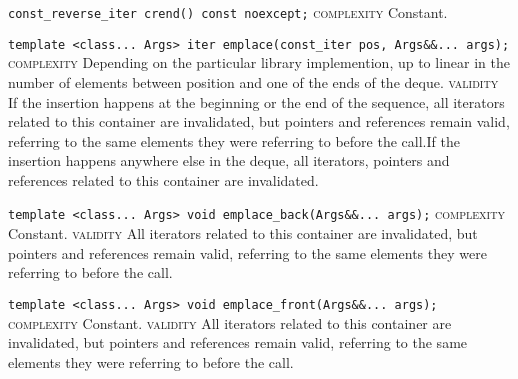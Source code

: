 \noindent{}\hspace*{0.25em}\lstinline[basicstyle=\ttfamily\color{cgreen}]{const_reverse_iter crend() const noexcept;} \textsc{complexity} Constant.\\\vspace{-0.6em}

\noindent{}\hspace*{0.25em}\lstinline[basicstyle=\ttfamily\color{corange}]{template <class... Args> iter emplace(const_iter pos, Args&&... args);} \textsc{complexity} Depending on the particular library implemention, up to linear in the number of elements between position and one of the ends of the deque. \textsc{validity} If the insertion happens at the beginning or the end of the sequence, all iterators related to this container are invalidated, but pointers and references remain valid, referring to the same elements they were referring to before the call.If the insertion happens anywhere else in the deque, all iterators, pointers and references related to this container are invalidated.\\\vspace{-0.6em}

\noindent{}\hspace*{0.25em}\lstinline[basicstyle=\ttfamily\color{cgreen}]{template <class... Args> void emplace_back(Args&&... args);} \textsc{complexity} Constant. \textsc{validity} All iterators related to this container are invalidated, but pointers and references remain valid, referring to the same elements they were referring to before the call.\\\vspace{-0.6em}

\noindent{}\hspace*{0.25em}\lstinline[basicstyle=\ttfamily\color{cgreen}]{template <class... Args> void emplace_front(Args&&... args);} \textsc{complexity} Constant. \textsc{validity} All iterators related to this container are invalidated, but pointers and references remain valid, referring to the same elements they were referring to before the call.\\\vspace{-0.6em}

